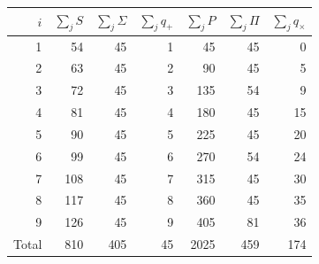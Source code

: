 \begin{tablacompleta}[htbp]
\caption{Évaluations cumulées par ligne du support APP.}
\label{tab:app-totales_filas}
\begin{tabular}{r*{6}{r}}
\toprule
$i$ & $\sum_j S$ & $\sum_j\Sigma$ & $\sum_j q_+$ & $\sum_j P$ & $\sum_j\Pi$ & $\sum_j q_\times$ \\
\midrule
1 & 54 & 45 & 1 & 45 & 45 & 0 \\
2 & 63 & 45 & 2 & 90 & 45 & 5 \\
3 & 72 & 45 & 3 & 135 & 54 & 9 \\
4 & 81 & 45 & 4 & 180 & 45 & 15 \\
5 & 90 & 45 & 5 & 225 & 45 & 20 \\
6 & 99 & 45 & 6 & 270 & 54 & 24 \\
7 & 108 & 45 & 7 & 315 & 45 & 30 \\
8 & 117 & 45 & 8 & 360 & 45 & 35 \\
9 & 126 & 45 & 9 & 405 & 81 & 36 \\
\midrule
Total & 810 & 405 & 45 & 2025 & 459 & 174 \\
\bottomrule
\end{tabular}
\end{tablacompleta}
